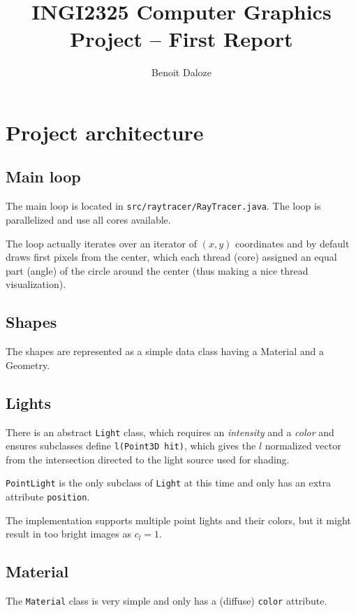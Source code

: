 \documentclass[a4paper,11pt]{article}
\title{INGI2325 Computer Graphics \\
  Project -- First Report}
\author{Benoit Daloze}
\begin{document}
\maketitle

\section{Project architecture}

\subsection{Main loop}

The main loop is located in \texttt{src/raytracer/RayTracer.java}.
The loop is parallelized and use all cores available.

The loop actually iterates over an iterator of $(x,y)$ coordinates and
by default draws first pixels from the center, which each thread (core) assigned an equal part (angle) of the circle around the center (thus making a nice thread visualization).

\subsection{Shapes}

The shapes are represented as a simple data class having a Material and a Geometry.

\subsection{Lights}

There is an abstract \texttt{Light} class, which requires an \emph{intensity} and a \emph{color} and ensures subclasses define \texttt{l(Point3D hit)}, which gives the $l$ normalized vector from the intersection directed to the light source used for shading.

\texttt{PointLight} is the only subclass of \texttt{Light} at this time and only has an extra attribute \texttt{position}.

The implementation supports multiple point lights and their colors, but it might result in too bright images as $c_l = 1$.

\subsection{Material}

The \texttt{Material} class is very simple and only has a (diffuse) \texttt{color} attribute.
\end{document}
